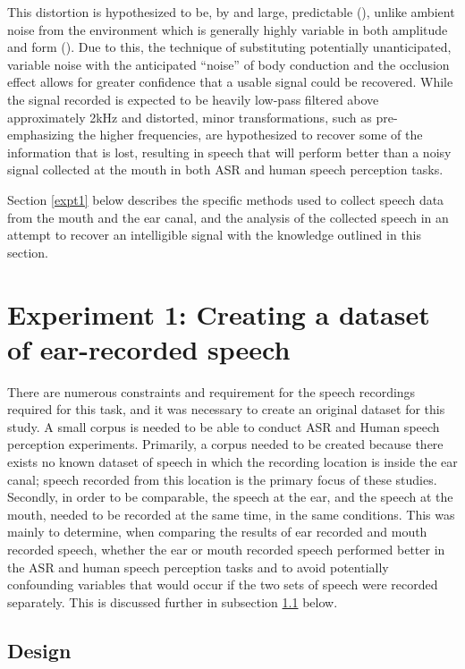 \documentclass[dissertation,copyright]{uathesis}
\begin{document}
This distortion is hypothesized to be, by and large, predictable (\cite{reinfeldt:10}), unlike ambient noise from the environment which is generally highly variable in both amplitude and form (\cite{zhang:17}).  Due to this, the technique of substituting potentially unanticipated, variable noise with the anticipated ``noise'' of body conduction and the occlusion effect allows for greater confidence that a usable signal could be recovered.  While the signal recorded is expected to be heavily low-pass filtered above approximately 2kHz and distorted, minor transformations, such as pre-emphasizing the higher frequencies, are hypothesized to recover some of the information that is lost, resulting in speech that will perform better than a noisy signal collected at the mouth in both ASR and human speech perception tasks.  

Section \ref{expt1} below describes the specific methods used to collect speech data from the mouth and the ear canal, and the analysis of the collected speech in an attempt to recover an intelligible signal with the knowledge outlined in this section.


\section{Experiment 1: Creating a dataset of ear-recorded speech\label{expt1}}

There are numerous constraints and requirement for the speech recordings required for this task, and it was necessary to create an original dataset for this study.  A small corpus is needed to be able to conduct ASR and Human speech perception experiments.  Primarily, a corpus needed to be created because there exists no known dataset of speech in which the recording location is inside the ear canal; speech recorded from this location is the primary focus of these studies.  Secondly, in order to be comparable, the speech at the ear, and the speech at the mouth, needed to be recorded at the same time, in the same conditions.  This was mainly to determine, when comparing the results of ear recorded and mouth recorded speech, whether the ear or mouth recorded speech performed better in the ASR and human speech perception tasks and to avoid potentially confounding variables that would occur if the two sets of speech were recorded separately. This is discussed further in subsection \ref{exp1design} below.

\subsection{Design}
\label{exp1design}
   
\end{document}
